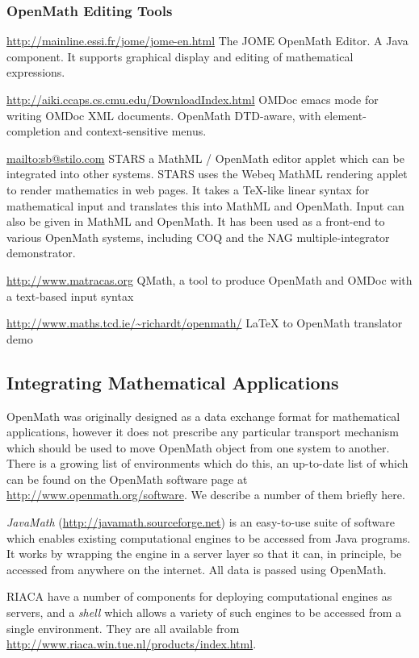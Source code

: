\documentclass[keylogo]{openmath}
\begin{document}
\subsubsection {OpenMath Editing Tools}
\url{http://mainline.essi.fr/jome/jome-en.html} The JOME OpenMath
Editor.  A Java component.  It supports graphical display and editing
of mathematical expressions.


\url{http://aiki.ccaps.cs.cmu.edu/DownloadIndex.html} OMDoc emacs
mode for writing OMDoc XML documents.
OpenMath DTD-aware, with element-completion and
context-sensitive menus.

\url{mailto:sb@stilo.com} STARS a MathML / OpenMath editor applet
which can be integrated into other systems.  STARS uses the Webeq
MathML rendering applet to render mathematics in web pages. It takes a
TeX-like linear syntax for mathematical input and translates this into
MathML and OpenMath.  Input can also be given in MathML and OpenMath.
It has been used as a front-end to various OpenMath systems, including
COQ and the NAG multiple-integrator demonstrator.

\url{http://www.matracas.org} QMath, a tool to produce OpenMath and
OMDoc with a text-based input syntax

\url{http://www.maths.tcd.ie/~richardt/openmath/} LaTeX to OpenMath
translator demo

\subsection{Integrating Mathematical Applications}

OpenMath was originally designed as a data exchange format for
mathematical applications, however it does not prescribe any
particular transport mechanism which should be used to move OpenMath
object from one system to another.  There is a growing list of
environments which do this, an up-to-date list of which can be found
on the OpenMath software page at
\url{http://www.openmath.org/software}.  We describe a number
of them briefly here.

\emph{JavaMath} (\url{http://javamath.sourceforge.net}) is an
easy-to-use suite of software which enables existing computational
engines to be accessed from Java programs.  It works by wrapping the
engine in a server layer so that it can, in principle, be accessed
from anywhere on the internet.  All data is passed using OpenMath.

RIACA have a number of components for deploying computational engines as
servers, and a \emph{shell} which allows a variety of such engines to be
accessed from a single environment.  They are all available from
\url{http://www.riaca.win.tue.nl/products/index.html}.
\end{document}
